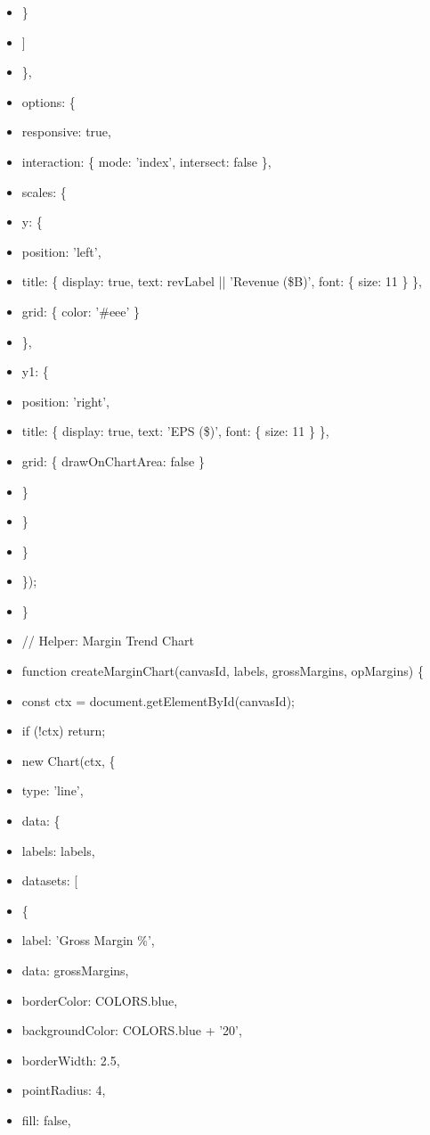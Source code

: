 \documentclass[11pt]{article}
\begin{document}
\begin{itemize}[leftmargin=*,itemsep=2pt,topsep=2pt]
\item {} \}
\item {} ]
\item {} \},
\item {} options: \{
\item {} responsive: true,
\item {} interaction: \{ mode: 'index', intersect: false \},
\item {} scales: \{
\item {} y: \{
\item {} position: 'left',
\item {} title: \{ display: true, text: revLabel || 'Revenue (\$B)', font: \{ size: 11 \} \},
\item {} grid: \{ color: '\#eee' \}
\item {} \},
\item {} y1: \{
\item {} position: 'right',
\item {} title: \{ display: true, text: 'EPS (\$)', font: \{ size: 11 \} \},
\item {} grid: \{ drawOnChartArea: false \}
\item {} \}
\item {} \}
\item {} \}
\item {} \});
\item {} \}
\item {} // Helper: Margin Trend Chart
\item {} function createMarginChart(canvasId, labels, grossMargins, opMargins) \{
\item {} const ctx = document.getElementById(canvasId);
\item {} if (!ctx) return;
\item {} new Chart(ctx, \{
\item {} type: 'line',
\item {} data: \{
\item {} labels: labels,
\item {} datasets: [
\item {} \{
\item {} label: 'Gross Margin \%',
\item {} data: grossMargins,
\item {} borderColor: COLORS.blue,
\item {} backgroundColor: COLORS.blue + '20',
\item {} borderWidth: 2.5,
\item {} pointRadius: 4,
\item {} fill: false,

\end{itemize}
\end{document}
